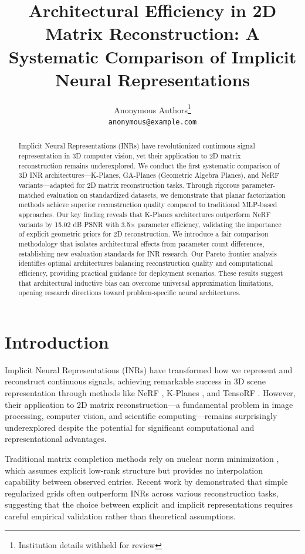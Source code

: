 \documentclass{article}
\title{Architectural Efficiency in 2D Matrix Reconstruction: A Systematic Comparison of Implicit Neural Representations}
\author{
  Anonymous Authors\thanks{Institution details withheld for review} \\
  \texttt{anonymous@example.com}
}
\begin{document}
\maketitle

\begin{abstract}
Implicit Neural Representations (INRs) have revolutionized continuous signal representation in 3D computer vision, yet their application to 2D matrix reconstruction remains underexplored. We conduct the first systematic comparison of 3D INR architectures—K-Planes, GA-Planes (Geometric Algebra Planes), and NeRF variants—adapted for 2D matrix reconstruction tasks. Through rigorous parameter-matched evaluation on standardized datasets, we demonstrate that planar factorization methods achieve superior reconstruction quality compared to traditional MLP-based approaches. Our key finding reveals that K-Planes architectures outperform NeRF variants by 15.02 dB PSNR with 3.5× parameter efficiency, validating the importance of explicit geometric priors for 2D reconstruction. We introduce a fair comparison methodology that isolates architectural effects from parameter count differences, establishing new evaluation standards for INR research. Our Pareto frontier analysis identifies optimal architectures balancing reconstruction quality and computational efficiency, providing practical guidance for deployment scenarios. These results suggest that architectural inductive bias can overcome universal approximation limitations, opening research directions toward problem-specific neural architectures.
\end{abstract}

\section{Introduction}

Implicit Neural Representations (INRs) have transformed how we represent and reconstruct continuous signals, achieving remarkable success in 3D scene representation through methods like NeRF \citep{mildenhall2020nerf}, K-Planes \citep{fridovich2023kplanes}, and TensoRF \citep{chen2022tensorf}. However, their application to 2D matrix reconstruction—a fundamental problem in image processing, computer vision, and scientific computing—remains surprisingly underexplored despite the potential for significant computational and representational advantages.

Traditional matrix completion methods rely on nuclear norm minimization \citep{candes2009matrix, recht2011simpler}, which assumes explicit low-rank structure but provides no interpolation capability between observed entries. Recent work by \citet{kim2025grids} demonstrated that simple regularized grids often outperform INRs across various reconstruction tasks, suggesting that the choice between explicit and implicit representations requires careful empirical validation rather than theoretical assumptions.
\end{document}
